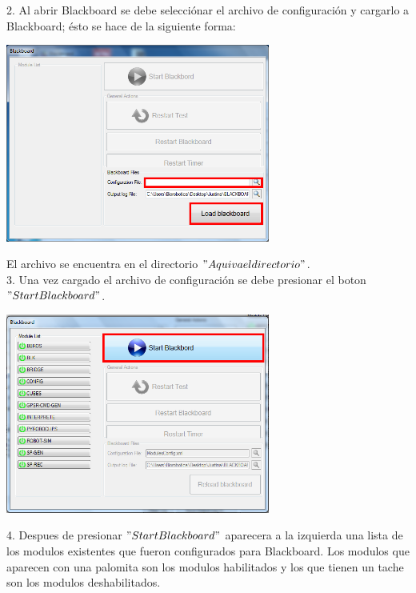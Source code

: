 \documentclass[user_manual.tex]{subfiles}
\begin{document}
2. Al abrir Blackboard se debe selecciónar el archivo de configuración y cargarlo a Blackboard; ésto se hace de la siguiente forma:

\begin{center}
\includegraphics[width=0.65\textwidth]{Figures/Puesta_marcha/Config_file.png}
\end{center}

El archivo se encuentra en el directorio $"Aqui va el directorio"$.\\

3. Una vez cargado el archivo de configuración se debe presionar el boton $ "Start Blackboard"$.

\begin{center}
\includegraphics[width=0.65\textwidth]{Figures/Puesta_marcha/Activar_Bb.png}
\end{center}


4. Despues de presionar $"Start Blackboard"$ aparecera a la izquierda una lista de los modulos existentes que fueron configurados para Blackboard. Los modulos que aparecen con una palomita son los modulos habilitados y los que tienen un tache son los modulos deshabilitados.
\end{document}

